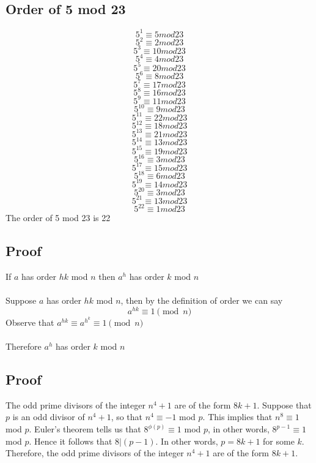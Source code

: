 \documentclass{article}
\begin{document}
\subsection{Order of 5 mod 23}
$$5^1 \equiv 5 mod 23$$
$$5^2 \equiv 2 mod 23$$
$$5^3 \equiv 10 mod 23$$
$$5^4 \equiv 4 mod 23$$
$$5^5 \equiv 20 mod 23$$
$$5^6 \equiv 8 mod 23$$
$$5^7 \equiv 17 mod 23$$
$$5^8 \equiv 16 mod 23$$
$$5^9 \equiv 11 mod 23$$
$$5^10 \equiv 9 mod 23$$
$$5^11 \equiv 22 mod 23$$
$$5^12 \equiv 18 mod 23$$
$$5^13 \equiv 21 mod 23$$
$$5^14 \equiv 13 mod 23$$
$$5^15 \equiv 19 mod 23$$
$$5^16 \equiv 3 mod 23$$
$$5^17 \equiv 15 mod 23$$
$$5^18 \equiv 6 mod 23$$
$$5^19 \equiv 14 mod 23$$
$$5^20 \equiv 3 mod 23$$
$$5^21 \equiv 13 mod 23$$
$$5^22 \equiv 1 mod 23$$
The order of 5 mod 23 is 22

\subsection{Proof}
If $a$ has order $hk$ mod $n$ then $a^{h}$ has order $k$ mod $n$
\\\\
Suppose $a$ has order $hk$ mod $n$, then by the definition of order we can say
$$a^{hk} \equiv 1 \pmod{n}$$
Observe that $a^{hk} \equiv a^{h^{k}} \equiv 1 \pmod{n}$
\\\\
Therefore $a^{h}$ has order $k$ mod $n$

\subsection{Proof}
The odd prime divisors of the integer $n^4 +1$ are of the form $8k + 1$.  
Suppose that $p$ is an odd divisor of $n^4 + 1$, so that $n^4 \equiv -1$ mod $p$. This implies that $n^8 \equiv 1$ mod $p$. Euler's theorem tells us that $8^{\phi (p)} \equiv 1$ mod $p$, in other words, $8^{p-1} \equiv 1$ mod $p$. Hence it follows that $8 | (p - 1)$. In other words, $p = 8k + 1$ for some $k$. Therefore, the odd prime divisors of the integer $n^4 + 1$ are of the form $8k + 1$.

\end{document}
